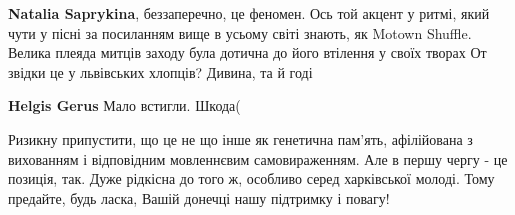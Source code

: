 \begin{itemize}
\textbf{Natalia Saprykina}, беззаперечно, це феномен.
Ось той акцент у ритмі, який чути у пісні за посиланням вище в усьому світі знають, як Motown Shuffle.
Велика плеяда митців заходу була дотична до його втілення у своїх творах
От звідки це у львівських хлопців?
Дивина, та й годі

\begin{itemize} %
 
\textbf{Helgis Gerus} Мало встигли. Шкода(
\end{itemize} %

 

Ризикну припустити, що це не що інше як генетична пам'ять, афілійована з
вихованням і відповідним мовленнєвим самовираженням. Але в першу чергу - це
позиція, так. Дуже рідкісна до того ж, особливо серед харківської молоді. Тому
предайте, будь ласка, Вашій донечці нашу підтримку і повагу!

\end{itemize} %

